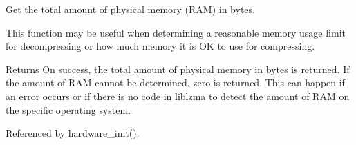 Get the total amount of physical memory (R\-A\-M) in bytes. 

This function may be useful when determining a reasonable memory usage limit for decompressing or how much memory it is O\-K to use for compressing.

\begin{DoxyReturn}{Returns}
On success, the total amount of physical memory in bytes is returned. If the amount of R\-A\-M cannot be determined, zero is returned. This can happen if an error occurs or if there is no code in liblzma to detect the amount of R\-A\-M on the specific operating system. 
\end{DoxyReturn}


Referenced by hardware\-\_\-init().


